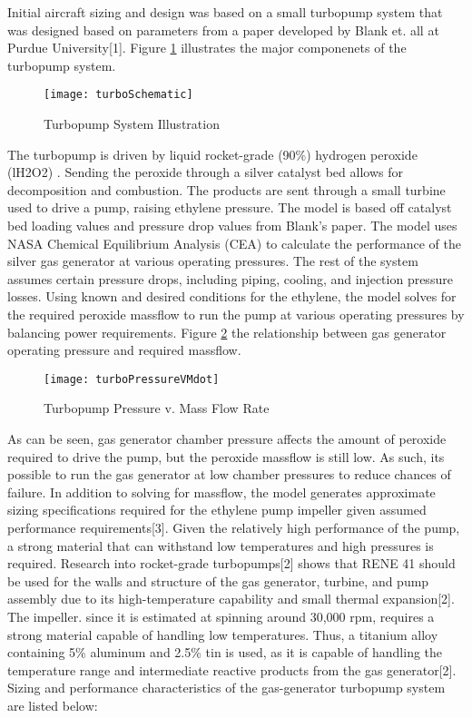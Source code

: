 Initial aircraft sizing and design was based on a small turbopump system that was designed based on parameters from a paper developed by Blank et. all at Purdue University[1]. Figure \ref{fig:turboSchematic} illustrates the major componenets of the turbopump system.

\begin{figure}[H]
\texttt{[image: turboSchematic]}
\caption{Turbopump System Illustration}
\label{fig:turboSchematic}
\end{figure}
 
The turbopump is driven by liquid rocket-grade (90\%) hydrogen peroxide (lH2O2) . Sending the peroxide through a silver catalyst bed allows for decomposition and combustion. The products are sent through a small turbine used to drive a pump, raising ethylene pressure. The model is based off catalyst bed loading values and pressure drop values from Blank’s paper. The model uses NASA Chemical Equilibrium Analysis (CEA) to calculate the performance of the silver gas generator at various operating pressures. The rest of the system assumes certain pressure drops, including piping, cooling, and injection pressure losses. Using known and desired conditions for the ethylene, the model solves for the required peroxide massflow to run the pump at various operating pressures by balancing power requirements. Figure \ref{fig:turboPressureVMdot} the relationship between gas generator operating pressure and required massflow. 

\begin{figure}[H]
\begin{center}
\texttt{[image: turboPressureVMdot]}
\caption{Turbopump Pressure v. Mass Flow Rate}
\label{fig:turboPressureVMdot}
\end{center}
\end{figure}


As can be seen, gas generator chamber pressure affects the amount of peroxide required to drive the pump, but the peroxide massflow is still low. As such, its possible to run the gas generator at low chamber pressures to reduce chances of failure. In addition to solving for massflow, the model generates approximate sizing specifications required for the ethylene pump impeller given assumed performance requirements[3]. Given the relatively high performance of the pump, a strong material that can withstand low temperatures and high pressures is required. Research into rocket-grade turbopumps[2] shows that RENE 41 should be used for the walls and structure of the gas generator, turbine, and pump assembly due to its high-temperature capability and small thermal expansion[2]. The impeller. since it is estimated at spinning around 30,000 rpm, requires a strong material capable of handling low temperatures. Thus, a titanium alloy containing 5\% aluminum and 2.5\% tin is used, as it is capable of handling the temperature range and intermediate reactive products from the gas generator[2]. Sizing and performance characteristics of the gas-generator turbopump system are listed below: 

